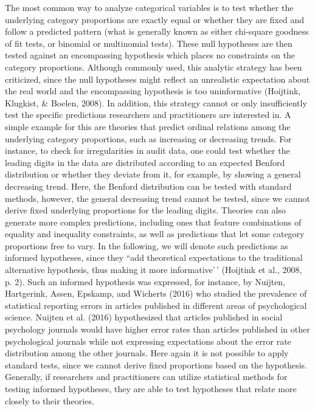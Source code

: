 \documentclass[
  english,
  man,floatsintext]{apa6}
\begin{document}
The most common way to analyze categorical variables is to test whether the underlying category proportions are exactly equal or whether they are fixed and follow a predicted pattern (what is generally known as either chi-square goodness of fit tests, or binomial or multinomial tests). These null hypotheses are then tested against an encompassing hypothesis which places no constraints on the category proportions. Although commonly used, this analytic strategy has been criticized, since the null hypotheses might reflect an unrealistic expectation about the real world and the encompassing hypothesis is too uninformative (Hoijtink, Klugkist, \& Boelen, 2008). In addition, this strategy cannot or only insufficiently test the specific predictions researchers and practitioners are interested in. A simple example for this are theories that predict ordinal relations among the underlying category proportions, such as increasing or decreasing trends. For instance, to check for irregularities in audit data, one could test whether the leading digits in the data are distributed according to an expected Benford distribution or whether they deviate from it, for example, by showing a general decreasing trend. Here, the Benford distribution can be tested with standard methods, however, the general decreasing trend cannot be tested, since we cannot derive fixed underlying proportions for the leading digits. Theories can also generate more complex predictions, including ones that feature combinations of equality and inequality constraints, as well as predictions that let some category proportions free to vary. In the following, we will denote such predictions as informed hypotheses, since they ``add theoretical expectations to the traditional alternative hypothesis, thus making it more informative'\,' (Hoijtink et al., 2008, p. 2). Such an informed hypothesis was expressed, for instance, by Nuijten, Hartgerink, Assen, Epskamp, and Wicherts (2016) who studied the prevalence of statistical reporting errors in articles published in different areas of psychological science. Nuijten et al. (2016) hypothesized that articles published in social psychology journals would have higher error rates than articles published in other psychological journals while not expressing expectations about the error rate distribution among the other journals. Here again it is not possible to apply standard tests, since we cannot derive fixed proportions based on the hypothesis. Generally, if researchers and practitioners can utilize statistical methods for testing informed hypotheses, they are able to test hypotheses that relate more closely to their theories.
\end{document}
